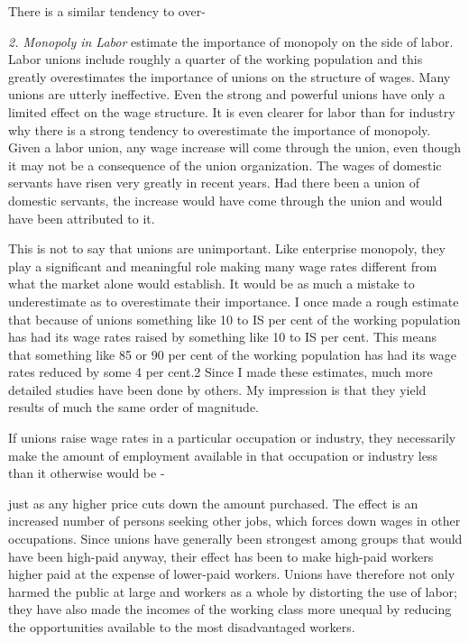 \documentclass[11pt,openany]{book}
\begin{document}
There is a similar tendency to over-

\emph{2. Monopoly in Labor} estimate the importance of monopoly on the side of labor. Labor unions include roughly a quarter of the working population and this greatly overestimates the importance of unions on the structure of wages. Many unions are utterly ineffective. Even the strong and powerful unions have only a limited effect on the wage structure. It is even clearer for labor than for industry why there is a strong tendency to overestimate the importance of monopoly. Given a labor union, any wage increase will come through the union, even though it may not be a consequence of the union organization. The wages of domestic servants have risen very greatly in recent years. Had there been a union of domestic servants, the increase would have come through the union and would have been attributed to it.

This is not to say that unions are unimportant. Like enterprise monopoly, they play a significant and meaningful role making many wage rates different from what the market alone would establish. It would be as much a mistake to underestimate as to overestimate their importance. I once made a rough estimate that because of unions something like 10 to IS per cent of the working population has had its wage rates raised by something like 10 to IS per cent. This means that something like 85 or 90 per cent of the working population has had its wage rates reduced by some 4 per cent.2 Since I made these estimates, much more detailed studies have been done by others. My impression is that they yield results of much the same order of magnitude.

If unions raise wage rates in a particular occupation or industry, they necessarily make the amount of employment available in that occupation or industry less than it otherwise would be -

just as any higher price cuts down the amount purchased. The effect is an increased number of persons seeking other jobs, which forces down wages in other occupations. Since unions have generally been strongest among groups that would have been high-paid anyway, their effect has been to make high-paid workers higher paid at the expense of lower-paid workers. Unions have therefore not only harmed the public at large and workers as a whole by distorting the use of labor; they have also made the incomes of the working class more unequal by reducing the opportunities available to the most disadvantaged workers.
\end{document}
